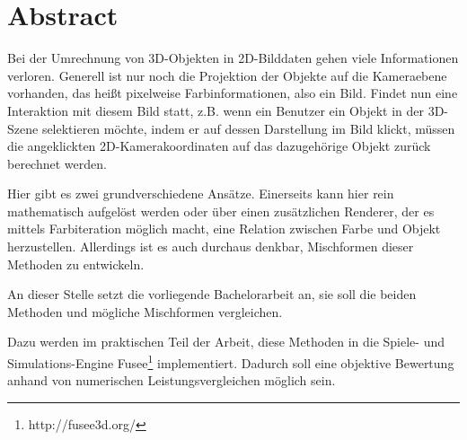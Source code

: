 \section{Abstract}

Bei der Umrechnung von 3D-Objekten in 2D-Bilddaten gehen viele Informationen verloren. Generell ist nur noch die Projektion der Objekte auf die Kameraebene vorhanden, das heißt pixelweise Farbinformationen, also ein Bild. Findet nun eine Interaktion mit diesem Bild statt, z.B. wenn ein Benutzer ein Objekt in der 3D-Szene selektieren möchte, indem er auf dessen Darstellung im Bild klickt, müssen die angeklickten 2D-Kamerakoordinaten auf das dazugehörige Objekt zurück berechnet werden.


Hier gibt es zwei grundverschiedene Ansätze. Einerseits kann hier rein mathematisch aufgelöst werden oder über einen zusätzlichen Renderer, der es mittels Farbiteration möglich macht, eine Relation zwischen Farbe und Objekt herzustellen. Allerdings ist es auch durchaus denkbar, Mischformen dieser Methoden zu entwickeln.


An dieser Stelle setzt die vorliegende Bachelorarbeit an, sie soll die beiden Methoden und mögliche Mischformen vergleichen.


Dazu werden im praktischen Teil der Arbeit, diese Methoden in die Spiele- und Simulations-Engine Fusee\footnote{http://fusee3d.org/} implementiert. Dadurch soll eine objektive Bewertung anhand von numerischen Leistungsvergleichen möglich sein.